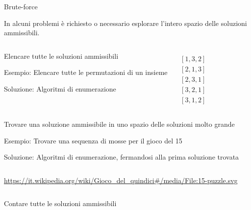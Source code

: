 \begin{frame}{Brute-force}

\vspace{-9pt}
\begin{myboxtitle}[Esplorazione]
In alcuni problemi è richiesto o necessario \alert{esplorare l'intero spazio delle soluzioni ammissibili}.
\end{myboxtitle}

\vspace{-9pt}
\begin{overprint}
\begin{columns}[T]
\begin{myboxtitle}[Enumerazione]
Elencare \alert{tutte} le soluzioni ammissibili

\medskip
\alert{Esempio}: Elencare tutte le permutazioni di un insieme

\medskip
\alert{Soluzione}: Algoritmi di enumerazione

\end{myboxtitle}
\bigskip
\begin{align*}
    [ 1, 2, 3 ] \\
    [ 1, 3, 2 ] \\
    [ 2, 1, 3 ] \\
    [ 2, 3, 1 ] \\
    [ 3, 2, 1 ] \\
    [ 3, 1, 2 ] 
\end{align*}
\end{columns}
\begin{columns}[T]
\begin{myboxtitle}[Ricerca]
Trovare \alert{una} soluzione ammissibile in uno spazio delle soluzioni molto grande

\medskip
\alert{Esempio}: Trovare una sequenza di mosse per il gioco del 15

\medskip
\alert{Soluzione}: Algoritmi di enumerazione, fermandosi alla prima soluzione trovata
\end{myboxtitle}
\begin{center}
\end{center}
\end{columns}

\medskip
\tiny
\url{https://it.wikipedia.org/wiki/Gioco_del_quindici\#/media/File:15-puzzle.svg}
\begin{columns}[T]
\begin{myboxtitle}[Conteggio]
Contare tutte le soluzioni ammissibili


\end{myboxtitle}
\end{columns}
\end{overprint}
\end{frame}
